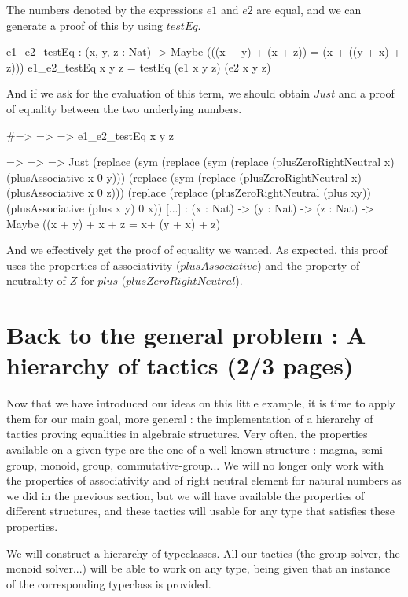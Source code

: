 \documentclass{sigplanconf}
\begin{document}
The numbers denoted by the expressions $e1$ and $e2$ are equal, and we can generate a proof of this by using $testEq$.
\begin{code}[caption=Test of equality betwen e1 and e2, captionpos=b, label=lst1:haskell2]
e1_e2_testEq : (x, y, z : Nat) 
       -> Maybe (((x + y) + (x + z)) 
                  = (x + ((y + x) + z)))
e1_e2_testEq x y z = testEq (e1 x y z)
                            (e2 x y z)
\end{code}

And if we ask for the evaluation of this term, we should obtain $Just$ and a proof of equality between the two underlying numbers.
\begin{code}[caption=Obtained proof, captionpos=b, label=lst1:haskell2]
#\x => \y => \z => e1_e2_testEq x y z

\x => \y => \z => Just (replace (sym (replace 
  (sym (replace (plusZeroRightNeutral x) 
  (plusAssociative x 0 y))) (replace 
  (sym (replace (plusZeroRightNeutral x) 
  (plusAssociative x 0 z))) (replace (replace 
  (plusZeroRightNeutral (plus xy)) 
  (plusAssociative (plus x y) 0 x)) [...]
: (x : Nat) -> (y : Nat) -> (z : Nat) 
  -> Maybe ((x + y) + x + z 
            = x+ (y + x) + z)
\end{code}

And we effectively get the proof of equality we wanted. As expected, this proof uses the properties of associativity ($plusAssociative$) and the property of neutrality of $Z$ for $plus$ ($plusZeroRightNeutral$).

\section {Back to the general problem : A hierarchy of tactics (2/3 pages)}

Now that we have introduced our ideas on this little example, it is time to apply them for our main goal, more general : the implementation of a hierarchy of tactics proving equalities in algebraic structures. Very often, the properties available on a given type are the one of a well known structure : magma, semi-group, monoid, group, commutative-group...  We will no longer only work with the properties of associativity and of right neutral element for natural numbers as we did in the previous section, but we will have available the properties of different structures, and these tactics will usable for any type that satisfies these properties.

We will construct a hierarchy of typeclasses. All our tactics (the group solver, the monoid solver...) will be able to work on any type, being given that an instance of the corresponding typeclass is provided.
\end{document}
